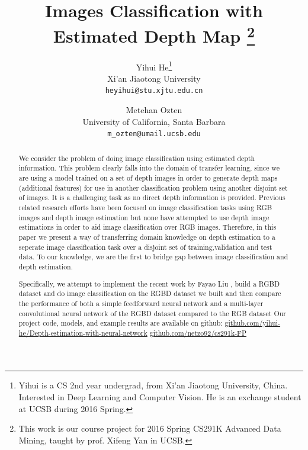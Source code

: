 \documentclass[10pt,twocolumn,letterpaper]{article}
\begin{document}
\title{Images Classification with Estimated Depth Map
\thanks{This work is our course project for 2016 Spring CS291K Advanced Data Mining, taught by prof. Xifeng Yan in UCSB.}}
\author{Yihui He\thanks{Yihui is a CS 2nd year undergrad, 
from Xi'an Jiaotong University, China. 
Interested in Deep Learning and Computer Vision. 
He is an exchange student at UCSB during 2016 Spring.}\\
Xi'an Jiaotong University\\
{\tt\small heyihui@stu.xjtu.edu.cn}
\and
Metehan Ozten\\
University of California, Santa Barbara\\
{\tt\small m\_ozten@umail.ucsb.edu}
}


\maketitle

\begin{abstract}
We consider the problem of doing image classification using estimated depth 
information. This problem clearly falls into the domain of transfer learning, since we are using a model trained on a set of depth images in order to generate depth maps (additional features) for use in another classification problem using another disjoint set of images. It is a challenging task as no direct depth information is 
provided. Previous related research efforts have been focused on image classification tasks using
RGB images and depth image estimation but none have attempted to use depth image estimations in order to aid image classification over RGB images. Therefore, in this paper we present a way of 
transferring domain knowledge on depth estimation to a seperate image classification task over a disjoint set of training,validation and test data. 
To our knowledge, we are the first to bridge gap between image classification and depth estimation.

Specifically, we attempt to implement the recent work by Fayao 
Liu \etal\cite{liu2015deep}, build a RGBD dataset and do image classification 
on the RGBD dataset we built and then compare the performance of both a simple feedforward neural network and a multi-layer convolutional neural network of the RGBD dataset compared to the RGB dataset 
Our project code, models, and example results are available on github: \href{
https://github.com/yihui-he/Depth-estimation-with-neural-network 
}{github.com/yihui-he/Depth-estimation-with-neural-network}
\href{https://github.com/netzo92/cs291k-FP}{github.com/netzo92/cs291k-FP}
\end{abstract}
\end{document}
